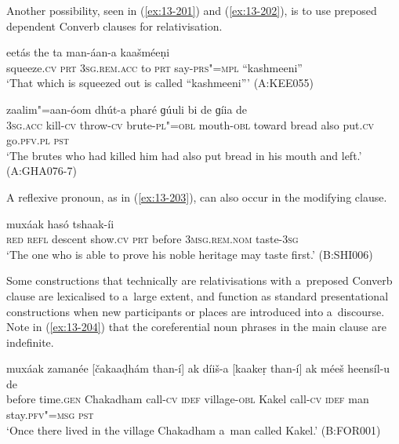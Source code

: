 Another possibility, seen in (\ref{ex:13-201}) and (\ref{ex:13-202}), is to use preposed dependent Converb clauses for relativisation.

\begin{exe}
\ex
\label{ex:13-201}
\gll [preeṣaá ba] eetás the ta man-áan-a  kaašméeṇi \\
squeeze.\textsc{cv} \textsc{prt} \textsc{3sg.rem.acc} to \textsc{prt} say-\textsc{prs"=mpl}  ``kashmeeni'' \\
\glt `That which is squeezed out is called ``kashmeeni''' (A:KEE055)

\ex
\label{ex:13-202}
 zaalim"=aan-óom dhút-a  pharé ɡúuli bi de ɡíia de \\
\textsc{3sg.acc} kill-\textsc{cv} throw-\textsc{cv} brute-\textsc{pl"=obl} mouth-\textsc{obl}  toward bread also put.\textsc{cv} go.\textsc{pfv.pl} \textsc{pst} \\
\glt `The brutes who had killed him had also put bread in his mouth and left.' (A:GHA076-7) 
\end{exe}

A reflexive pronoun, as in (\ref{ex:13-203}), can also occur in the modifying clause. 

\begin{exe}
\ex
\label{ex:13-203}
 muxáak hasó  tshaak-íi \\
\textsc{red} \textsc{refl} descent show.\textsc{cv} \textsc{prt} before \textsc{3msg.rem.nom}  taste-\textsc{3sg} \\
\glt `The one who is able to prove his noble heritage may taste first.' (B:SHI006) 
\end{exe}

Some constructions that technically are relativisations with a~preposed Converb clause are lexicalised to a~large extent, and function as standard presentational constructions when new participants or places are introduced into a~discourse. Note in (\ref{ex:13-204}) that the coreferential noun phrases in the main clause are indefinite.

\begin{exe}
\ex
\label{ex:13-204}
\gll muxáak zamanée [čakaaḍhám than-í] ak díiš-a  [kaakeṛ than-í] ak méeš heensíl-u de  \\
before time.\textsc{gen} Chakadham call-\textsc{cv} \textsc{idef} village-\textsc{obl}  Kakel call-\textsc{cv} \textsc{idef} man stay.\textsc{pfv"=msg} \textsc{pst} \\
\glt `Once there lived in the village Chakadham a~man called Kakel.' (B:FOR001)
\end{exe}

